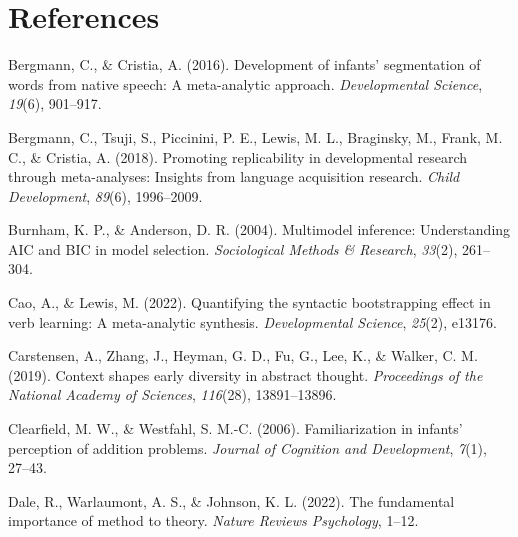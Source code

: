 \documentclass[10pt, letterpaper]{article}
\newenvironment{CSLReferences}%
  {}%
  {\par}
\begin{document}
\hypertarget{references}{%
\section{References}\label{references}}

\setlength{\parindent}{-0.1in} 
\setlength{\leftskip}{0.125in}

\noindent

\hypertarget{refs}{}
\begin{CSLReferences}{1}{0}
\leavevmode{}%
Bergmann, C., \& Cristia, A. (2016). Development of infants'
segmentation of words from native speech: A meta-analytic approach.
\emph{Developmental Science}, \emph{19}(6), 901--917.

\leavevmode{}%
Bergmann, C., Tsuji, S., Piccinini, P. E., Lewis, M. L., Braginsky, M.,
Frank, M. C., \& Cristia, A. (2018). Promoting replicability in
developmental research through meta-analyses: Insights from language
acquisition research. \emph{Child Development}, \emph{89}(6),
1996--2009.

\leavevmode{}%
Burnham, K. P., \& Anderson, D. R. (2004). Multimodel inference:
Understanding AIC and BIC in model selection. \emph{Sociological Methods
\& Research}, \emph{33}(2), 261--304.

\leavevmode{}%
Cao, A., \& Lewis, M. (2022). Quantifying the syntactic bootstrapping
effect in verb learning: A meta-analytic synthesis. \emph{Developmental
Science}, \emph{25}(2), e13176.

\leavevmode{}%
Carstensen, A., Zhang, J., Heyman, G. D., Fu, G., Lee, K., \& Walker, C.
M. (2019). Context shapes early diversity in abstract thought.
\emph{Proceedings of the National Academy of Sciences}, \emph{116}(28),
13891--13896.

\leavevmode{}%
Clearfield, M. W., \& Westfahl, S. M.-C. (2006). Familiarization in
infants' perception of addition problems. \emph{Journal of Cognition and
Development}, \emph{7}(1), 27--43.

\leavevmode{}%
Dale, R., Warlaumont, A. S., \& Johnson, K. L. (2022). The fundamental
importance of method to theory. \emph{Nature Reviews Psychology}, 1--12.


\end{CSLReferences}
\end{document}

